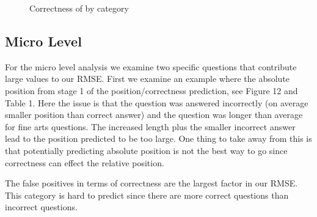\documentclass[letterpaper]{article}
\begin{document}
\begin{figure}[H]
	\begin{center}
	\end{center}
	\caption{Correctness of by category}
	\label{fig:corr_off}
\end{figure}

\subsection{Micro Level}
\label{sec:micro}
For the micro level analysis we examine two specific questions that contribute large values to our RMSE.  First we examine an example where the absolute position from stage 1 of the position/correctness prediction, see Figure 12 and Table 1.  Here the issue is that the question was answered incorrectly (on average smaller position than correct answer) and the question was longer than average for fine arts questions.  The increased length plus the smaller incorrect answer lead to the position predicted to be too large.  One thing to take away from this is that potentially predicting absolute position is not the best way to go since correctness can effect the relative position. 

The false positives in terms of correctness are the largest factor in our RMSE.  This category is hard to predict since there are more correct questions than incorrect questions.  
\end{document}
